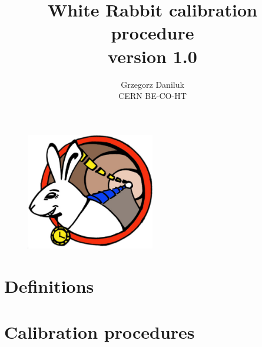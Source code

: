 \documentclass[a4paper, 12pt]{article}
\begin{document}
\title{White Rabbit calibration procedure\\[0.5cm]
\large {version 1.0}}
\author{Grzegorz Daniluk\\ CERN BE-CO-HT}

\maketitle
\thispagestyle{empty}

\begin{figure}[ht!]
  \centering
  \vspace{1.3cm}
  \includegraphics[width=0.50\textwidth]{logo/WRlogo.pdf}
  \label{fig:wr_logo}
\end{figure}

\newpage

\newpage

\newpage

\tableofcontents

\newpage


\newpage
\section{Definitions}


\newpage


\newpage
\section{Calibration procedures}
\label{sec:calib_proc}


\newpage


\newpage


\appendix
\newpage

\newpage


\newpage


\end{document}
